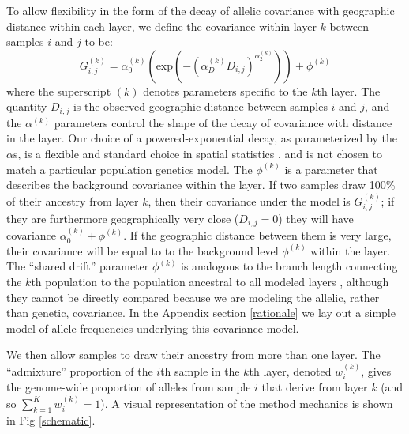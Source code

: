 \documentclass[12pt]{article}
\begin{document}
To allow flexibility in the form of the decay of allelic covariance with geographic distance within each layer, 
we define the covariance within layer $k$ between samples $i$ and $j$ to be:
\begin{equation}
G^{(k)}_{i,j} 
    = 
    \alpha^{(k)}_0 \left( \text{exp} \left( -(\alpha^{(k)}_D D_{i,j}) ^ {\alpha^{(k)}_2}	\right) \right) + \phi^{(k)}
\label{within_layer_covariance}
\end{equation}
where the superscript $(k)$ denotes parameters specific to the $k$th layer.
The quantity $D_{i,j}$ is the observed geographic distance between samples $i$ and $j$,
and the $\alpha^{(k)}$ parameters control the shape of the decay of
covariance with distance in the layer.
Our choice of a powered-exponential decay, 
as parameterized by the $\alpha$s, 
is a flexible and standard choice in spatial statistics \citep{Diggle1998}, 
and is not chosen to match a particular population genetics model. 
The $\phi^{(k)}$ is a parameter that describes the background covariance within the layer. 
If two samples draw 100\% of their ancestry from layer $k$, then their covariance under the model is $G^{(k)}_{i,j}$;
if they are furthermore geographically very close ($D_{i,j}=0$)
they will have covariance $\alpha^{(k)}_0 +  \phi^{(k)}$.
If the geographic distance between them is very large, 
their covariance will be equal to to the background level $\phi^{(k)}$ within the layer.
The ``shared drift'' parameter $\phi^{(k)}$ is analogous to 
the branch length connecting the $k$th population to the population ancestral to all modeled
layers \citep[see for example ][]{patterson_ancient_2012,peter_fstats},
although they cannot be directly compared because 
we are modeling the allelic, rather than genetic, covariance. 
In the Appendix section \ref{rationale} we lay out a
simple model of allele frequencies underlying this covariance model.

We then allow samples to draw their ancestry from more than one layer.
The ``admixture'' proportion of the $i$th sample in the $k$th layer, denoted $w^{(k)}_i$,
gives the genome-wide proportion of alleles from sample $i$ that derive from
layer 
$k$ (and so $\sum_{k=1}^K w^{(k)}_i =1$).
A visual representation of the method mechanics is shown in Fig \ref{schematic}.
\end{document}
